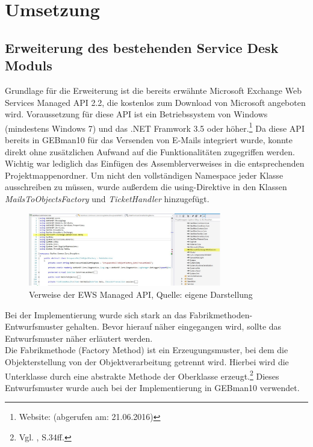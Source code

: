 \section{Umsetzung}

\subsection{Erweiterung des bestehenden Service Desk Moduls}
\noindent
Grundlage für die Erweiterung ist die bereits erwähnte Microsoft Exchange Web Services Managed API 2.2, die kostenlos zum Download von Microsoft angeboten wird. Voraussetzung für diese API ist ein Betriebssystem von Windows (mindestens Windows 7) und das .NET Framwork 3.5 oder höher.\footnote{Website: \citeauthor{DownloadAPI} (abgerufen am: 21.06.2016)}\newline 
Da diese API bereits in GEBman10 für das Versenden von E-Mails integriert wurde, konnte direkt ohne zusätzlichen Aufwand auf die Funktionalitäten zugegriffen werden. Wichtig war lediglich das Einfügen des Assemblerverweises in die entsprechenden Projektmappenordner. Um nicht den vollständigen Namespace jeder Klasse ausschreiben zu müssen, wurde außerdem die using-Direktive in den Klassen \textit{MailsToObjectsFactory} und \textit{TicketHandler} hinzugefügt.

\begin{figure}[h!]
\centering
\includegraphics[width=0.75\textwidth]{Abbildungen/Screenshot_Verweise.pdf}
	\caption[Verweise der EWS Managed API]{Verweise der EWS Managed API, Quelle: eigene Darstellung}
	\label{fig:Verweise}
\end{figure}

\noindent
Bei der Implementierung wurde sich stark an das Fabrikmethoden-Entwurfsmuster gehalten. Bevor hierauf näher eingegangen wird, sollte das Entwurfsmuster näher erläutert werden.\\
\noindent
Die Fabrikmethode (Factory Method) ist ein Erzeugungsmuster, bei dem die Objekterstellung von der Objektverarbeitung getrennt wird. Hierbei wird die Unterklasse durch eine abstrakte Methode der Oberklasse erzeugt.\footnote{Vgl. \citeauthor{PatternsKompakt} \citeyear{PatternsKompakt}, S.34ff.} Dieses Entwurfsmuster wurde auch bei der Implementierung in GEBman10 verwendet.\\ 

